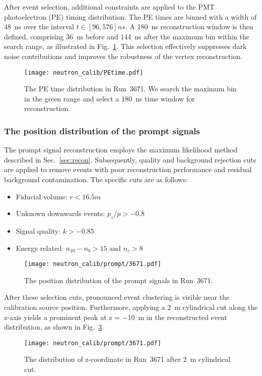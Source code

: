 After event selection, additional constraints are applied to the PMT photoelectron (PE) timing distribution.
The PE times are binned with a width of \SI{48}{ns} over the interval $t \in [96,576]\si{ns}$.
A \SI{180}{ns} reconstruction window is then defined, comprising \SI{36}{ns} before and \SI{144}{ns} after the maximum bin within the search range, as illustrated in Fig.~\ref{fig:PEtime}.
This selection effectively suppresses dark noise contributions and improves the robustness of the vertex reconstruction.
\begin{figure}[htbp]
	\centering
	\texttt{[image: neutron\_calib/PEtime.pdf]}
	\caption{The PE time distribution in Run~3671. We search the maximum bin in the green range and select a \SI{180}{ns} time window for reconstruction.}
	\label{fig:PEtime}
\end{figure}

\subsubsection{The position distribution of the prompt signals}
The prompt signal reconstruction employs the maximum likelihood method described in Sec.~\ref{sec:recon}.
Subsequently, quality and background rejection cuts are applied to remove events with poor reconstruction performance and residual background contamination. The specific cuts are as follows:
\begin{itemize}
	\item Fiducial volume: $r<16.5\si{m}$
	\item Unknown downwards events: $p_z/p>-0.8$
	\item Signal quality: $k>-0.85$
	\item Energy related: $n_{10}-n_{b}>15$ and $n_c>8$
\end{itemize}

\begin{figure}[htbp]
	\centering
	\texttt{[image: neutron\_calib/prompt/3671.pdf]}
	\caption{The position distribution of the prompt signals in Run~3671.}
	\label{fig:positionPrompt}
\end{figure}
After these selection cuts, pronounced event clustering is visible near the calibration source position.
Furthermore, applying a \SI{2}{m} cylindrical cut along the z-axis yields a prominent peak at z = \SI{-10}{m} in the reconstructed event distribution, as shown in Fig.~\ref{fig:positionPrompt_z}.
\begin{figure}[htbp]
	\centering
	\texttt{[image: neutron\_calib/prompt/3671.pdf]}
	\caption{The distribution of z-coordinate in Run~3671 after \SI{2}{m} cylindrical cut.}
	\label{fig:positionPrompt_z}
\end{figure}

